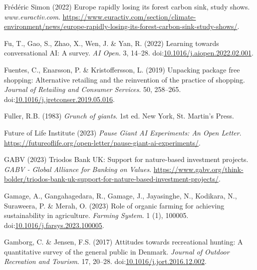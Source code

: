 \documentclass[
  letterpaper,
  DIV=11,
  numbers=noendperiod]{scrartcl}
\newlength{\cslhangindent}
\newenvironment{CSLReferences}[2] %
 {\begin{list}{}{%
  \setlength{\itemindent}{0pt}
  \setlength{\leftmargin}{0pt}
  \setlength{\parsep}{0pt}
  \ifodd #1
   \setlength{\leftmargin}{\cslhangindent}
   \setlength{\itemindent}{-1\cslhangindent}
  \fi
  \setlength{\itemsep}{#2\baselineskip}}}
 {\end{list}}
\begin{document}
\begin{CSLReferences}{0}{1}
Frédéric Simon (2022) Europe rapidly losing its forest carbon sink,
study shows. \emph{www.euractiv.com}.
\url{https://www.euractiv.com/section/climate-environment/news/europe-rapidly-losing-its-forest-carbon-sink-study-shows/}.

Fu, T., Gao, S., Zhao, X., Wen, J. \& Yan, R. (2022) Learning towards
conversational {AI}: {A} survey. \emph{AI Open}. 3, 14--28.
doi:\href{https://doi.org/10.1016/j.aiopen.2022.02.001}{10.1016/j.aiopen.2022.02.001}.

Fuentes, C., Enarsson, P. \& Kristoffersson, L. (2019) Unpacking package
free shopping: {Alternative} retailing and the reinvention of the
practice of shopping. \emph{Journal of Retailing and Consumer Services}.
50, 258--265.
doi:\href{https://doi.org/10.1016/j.jretconser.2019.05.016}{10.1016/j.jretconser.2019.05.016}.

Fuller, R.B. (1983) \emph{Grunch of giants}. 1st ed. New York, St.
Martin's Press.

Future of Life Institute (2023) \emph{Pause {Giant AI Experiments}: {An
Open Letter}}.
\url{https://futureoflife.org/open-letter/pause-giant-ai-experiments/}.

GABV (2023) Triodos {Bank UK}: {Support} for nature-based investment
projects. \emph{GABV - Global Alliance for Banking on Values}.
\url{https://www.gabv.org/think-bolder/triodos-bank-uk-support-for-nature-based-investment-projects/}.

Gamage, A., Gangahagedara, R., Gamage, J., Jayasinghe, N., Kodikara, N.,
Suraweera, P. \& Merah, O. (2023) Role of organic farming for achieving
sustainability in agriculture. \emph{Farming System}. 1 (1), 100005.
doi:\href{https://doi.org/10.1016/j.farsys.2023.100005}{10.1016/j.farsys.2023.100005}.

Gamborg, C. \& Jensen, F.S. (2017) Attitudes towards recreational
hunting: {A} quantitative survey of the general public in {Denmark}.
\emph{Journal of Outdoor Recreation and Tourism}. 17, 20--28.
doi:\href{https://doi.org/10.1016/j.jort.2016.12.002}{10.1016/j.jort.2016.12.002}.


\end{CSLReferences}
\end{document}
